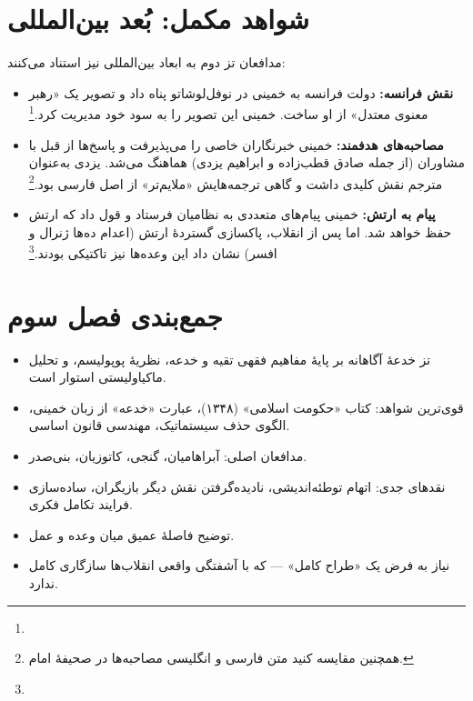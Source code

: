 \section{شواهد مکمل: بُعد بین‌المللی}

مدافعان تز دوم به ابعاد بین‌المللی نیز استناد می‌کنند:

\begin{itemize}[label=\textcolor{cPrimary}{$\blacktriangleright$}, rightmargin=2em]
    \item \textbf{نقش فرانسه:} دولت فرانسه به خمینی در نوفل‌لوشاتو پناه داد و تصویر یک «رهبر معنوی معتدل» از او ساخت. خمینی این تصویر را به سود خود مدیریت کرد.\footnote{}
    
    \item \textbf{مصاحبه‌های هدفمند:} خمینی خبرنگاران خاصی را می‌پذیرفت و پاسخ‌ها از قبل با مشاوران (از جمله صادق قطب‌زاده و ابراهیم یزدی) هماهنگ می‌شد. یزدی به‌عنوان مترجم نقش کلیدی داشت و گاهی ترجمه‌هایش «ملایم‌تر» از اصل فارسی بود.\footnote{ همچنین مقایسه کنید متن فارسی و انگلیسی مصاحبه‌ها در صحیفهٔ امام.}
    
    \item \textbf{پیام به ارتش:} خمینی پیام‌های متعددی به نظامیان فرستاد و قول داد که ارتش حفظ خواهد شد. اما پس از انقلاب، پاکسازی گستردهٔ ارتش (اعدام ده‌ها ژنرال و افسر) نشان داد این وعده‌ها نیز تاکتیکی بودند.\footnote{}
\end{itemize}

\section{جمع‌بندی فصل سوم}

\begin{principleBox}
\begin{itemize}[label=\textcolor{cPrimary}{$\blacksquare$}, rightmargin=2em]
    \item تز خدعهٔ آگاهانه بر پایهٔ مفاهیم فقهی تقیه و خدعه، نظریهٔ پوپولیسم، و تحلیل ماکیاولیستی استوار است.
    \item قوی‌ترین شواهد: کتاب «حکومت اسلامی» (۱۳۴۸)، عبارت «خدعه» از زبان خمینی، الگوی حذف سیستماتیک، مهندسی قانون اساسی.
    \item مدافعان اصلی: آبراهامیان، گنجی، کاتوزیان، بنی‌صدر.
    \item نقدهای جدی: اتهام توطئه‌اندیشی، نادیده‌گرفتن نقش دیگر بازیگران، ساده‌سازی فرایند تکامل فکری.
    \item {} توضیح فاصلهٔ عمیق میان وعده و عمل.
    \item {} نیاز به فرض یک «طراح کامل» — که با آشفتگی واقعی انقلاب‌ها سازگاری کامل ندارد.
\end{itemize}
\end{principleBox}


